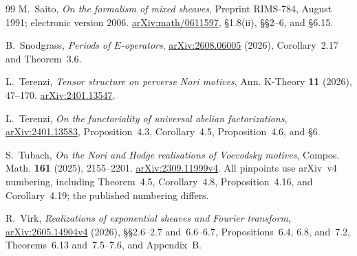 \documentclass[11pt]{article}
\numberwithin{equation}{section}
\theoremstyle{definition}
\theoremstyle{remark}
\begin{document}
\begin{thebibliography}{99}
M.~Saito, \emph{On the formalism of mixed sheaves},
Preprint RIMS-784, August 1991; electronic version 2006.
\href{https://arxiv.org/abs/math/0611597}{arXiv:math/0611597},
\S1.8(ii), \S\S2--6, and \S6.15.

B.~Snodgrass, \emph{Periods of $E$-operators},
\href{https://arxiv.org/abs/2608.06005}{arXiv:2608.06005} (2026),
Corollary~2.17 and Theorem~3.6.

L.~Terenzi, \emph{Tensor structure on perverse Nori motives},
Ann. K-Theory \textbf{11} (2026), 47--170.
\href{https://arxiv.org/abs/2401.13547}{arXiv:2401.13547}.

L.~Terenzi, \emph{On the functoriality of universal abelian factorizations},
\href{https://arxiv.org/abs/2401.13583}{arXiv:2401.13583},
Proposition~4.3, Corollary~4.5, Proposition~4.6, and \S6.

S.~Tubach, \emph{On the Nori and Hodge realisations of Voevodsky motives},
Compos. Math. \textbf{161} (2025), 2155--2201.
\href{https://arxiv.org/abs/2309.11999v4}{arXiv:2309.11999v4}.
All pinpoints use arXiv~v4 numbering, including Theorem~4.5,
Corollary~4.8, Proposition~4.16, and Corollary~4.19; the published
numbering differs.

R.~Virk, \emph{Realizations of exponential sheaves and Fourier transform},
\href{https://arxiv.org/abs/2605.14904v4}{arXiv:2605.14904v4} (2026),
\S\S2.6--2.7 and~6.6--6.7, Propositions~6.4, 6.8, and~7.2,
Theorems~6.13 and~7.5--7.6, and Appendix~B.

\end{thebibliography}
\end{document}
